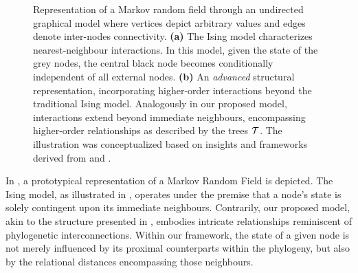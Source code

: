 \documentclass[
11pt, %
oneside, %
english, %
singlespacing, %
headsepline, %
chapterinoneline, %
]{MastersDoctoralThesis} %
\def\T{{\cal T}}
\begin{document}
\begin{figure}[h]
\begin{subfigure}[b]{0.49\textwidth}
		\caption{}
		\label{fig: Ising model higher order}
	\end{subfigure}
	\caption{Representation of a Markov random field through an undirected graphical model where vertices depict arbitrary values and edges denote inter-nodes connectivity. \textbf{(a)} The Ising model \cite{isingBeitragZurTheorie1925} characterizes nearest-neighbour interactions. In this model, given the state of the grey nodes, the central black node becomes conditionally independent of all external nodes. \textbf{(b)} An \textit{advanced} structural representation, incorporating higher-order interactions beyond the traditional Ising model. Analogously in our proposed model, interactions extend beyond immediate neighbours, encompassing higher-order relationships as described by the trees $\T$. The illustration was conceptualized based on insights and frameworks derived from \cite{MarkovRandomField} and \cite{acarMarkovRandomField2016}. }
	\label{fig:MRF}
\end{figure}

In , a prototypical representation of a Markov Random Field is depicted. The Ising model, as illustrated in , operates under the premise that a node's state is solely contingent upon its immediate neighbours. Contrarily, our proposed model, akin to the structure presented in , embodies intricate relationships reminiscent of phylogenetic interconnections. Within our framework, the state of a given node is not merely influenced by its proximal counterparts within the phylogeny, but also by the relational distances encompassing those neighbours.
\end{document}
